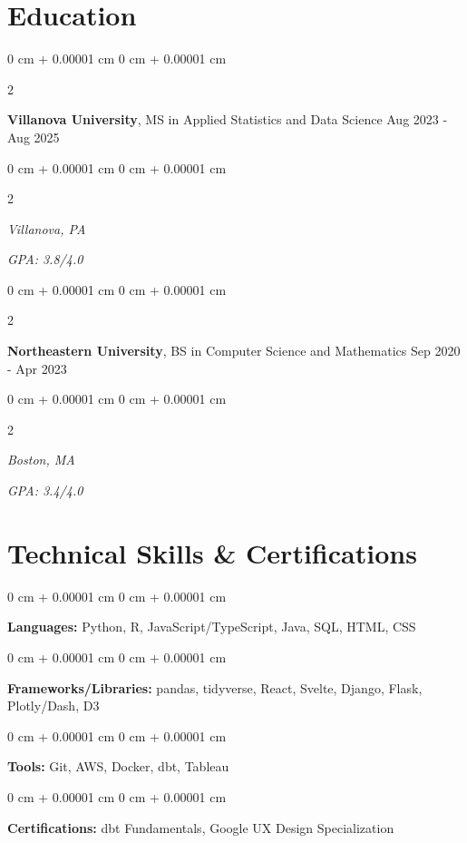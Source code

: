 \documentclass[12pt, letterpaper]{article}
\newenvironment{onecolentry}{
    \begin{adjustwidth}{
        0 cm + 0.00001 cm
    }{
        0 cm + 0.00001 cm
    }
}{
    \end{adjustwidth}
} %
\newenvironment{twocolentry}[2][]{
    \onecolentry
    \def\secondColumn{#2}
    \setcolumnwidth{\fill, 4.5 cm}
    \begin{paracol}{2}
}{
    \switchcolumn \raggedleft \secondColumn
    \end{paracol}
    \endonecolentry
} %
\begin{document}
    \section{Education}
    \vspace{0.05 cm}
    \begin{twocolentry}{
        Aug 2023 - Aug 2025
    }
    \textbf{Villanova University}, MS in Applied Statistics and Data Science \end{twocolentry}
    \begin{twocolentry}{
        \textit{GPA: 3.8/4.0}
    }
    \textit{Villanova, PA}
    \end{twocolentry}
    \vspace{0.12 cm}
    \begin{twocolentry}{
        Sep 2020 - Apr 2023
    }
    \textbf{Northeastern University}, BS in Computer Science and Mathematics \end{twocolentry}
    \begin{twocolentry}{
        \textit{GPA: 3.4/4.0}
    }
    \textit{Boston, MA}
    \end{twocolentry}

    \enlargethispage{1.5\baselineskip}\section{Technical Skills \& Certifications}
    \vspace{0.15cm}
    \begin{onecolentry}
      \textbf{Languages:} Python, R, JavaScript/TypeScript, Java, SQL, HTML, CSS
    \end{onecolentry}
    \vspace{0.03cm}
    \begin{onecolentry}
      \textbf{Frameworks/Libraries:} pandas, tidyverse, React, Svelte, Django, Flask, Plotly/Dash, D3
    \end{onecolentry}
    \vspace{0.03cm}
    \begin{onecolentry}
      \textbf{Tools:} Git, AWS, Docker, dbt, Tableau
    \end{onecolentry}
    \vspace{0.03cm}
    \begin{onecolentry}
      \textbf{Certifications:} dbt Fundamentals, Google UX Design Specialization
    \end{onecolentry}
\end{document}
